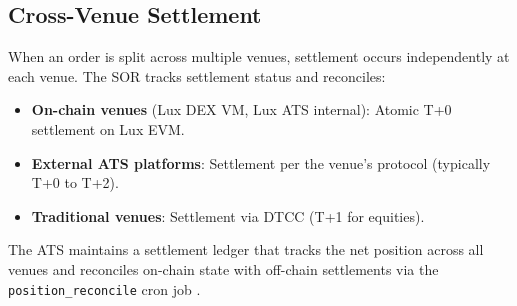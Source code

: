 \subsection{Cross-Venue Settlement}

When an order is split across multiple venues, settlement occurs independently at each venue. The SOR tracks settlement status and reconciles:

\begin{itemize}[nosep]
  \item \textbf{On-chain venues} (Lux DEX VM, Lux ATS internal): Atomic T+0 settlement on Lux EVM.
  \item \textbf{External ATS platforms}: Settlement per the venue's protocol (typically T+0 to T+2).
  \item \textbf{Traditional venues}: Settlement via DTCC (T+1 for equities).
\end{itemize}

The ATS maintains a settlement ledger that tracks the net position across all venues and reconciles on-chain state with off-chain settlements via the \texttt{position\_reconcile} cron job \cite{lux-ats-architecture}.

